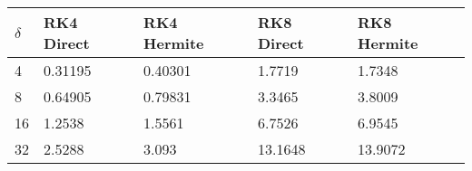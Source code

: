 \begin{tabular}{lllll}
\hline
$\delta$ & RK4 Direct & RK4 Hermite & RK8 Direct & RK8 Hermite \\ 
\hline 
4 & 0.31195 & 0.40301 & 1.7719 & 1.7348 \\ 
8 & 0.64905 & 0.79831 & 3.3465 & 3.8009 \\ 
16 & 1.2538 & 1.5561 & 6.7526 & 6.9545 \\ 
32 & 2.5288 & 3.093 & 13.1648 & 13.9072 \\ 
\hline 
\end{tabular}